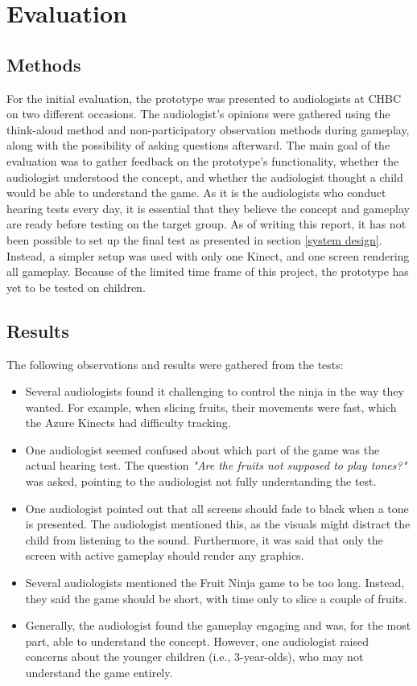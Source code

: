 \section{Evaluation}

\subsection{Methods}
For the initial evaluation, the prototype was presented to audiologists at CHBC on two different occasions. The audiologist's opinions were gathered using the think-aloud method \cite{thinkAloud} and non-participatory observation methods during gameplay, along with the possibility of asking questions afterward. The main goal of the evaluation was to gather feedback on the prototype's functionality, whether the audiologist understood the concept, and whether the audiologist thought a child would be able to understand the game. As it is the audiologists who conduct hearing tests every day, it is essential that they believe the concept and gameplay are ready before testing on the target group. As of writing this report, it has not been possible to set up the final test as presented in section \ref{system design}. Instead, a simpler setup was used with only one Kinect, and one screen rendering all gameplay. Because of the limited time frame of this project, the prototype has yet to be tested on children. 

\subsection{Results} \label{results}

The following observations and results were gathered from the tests:
\begin{itemize}
    \item Several audiologists found it challenging to control the ninja in the way they wanted. For example, when slicing fruits, their movements were fast, which the Azure Kinects had difficulty tracking. 
    \item One audiologist seemed confused about which part of the game was the actual hearing test. The question \textit{"Are the fruits not supposed to play tones?"} was asked, pointing to the audiologist not fully understanding the test. 
    \item One audiologist pointed out that all screens should fade to black when a tone is presented. The audiologist mentioned this, as the visuals might distract the child from listening to the sound. Furthermore, it was said that only the screen with active gameplay should render any graphics. 
    \item Several audiologists mentioned the Fruit Ninja game to be too long. Instead, they said the game should be short, with time only to slice a couple of fruits. 
    \item Generally, the audiologist found the gameplay engaging and was, for the most part, able to understand the concept. However, one audiologist raised concerns about the younger children (i.e., 3-year-olds), who may not understand the game entirely.
\end{itemize}

